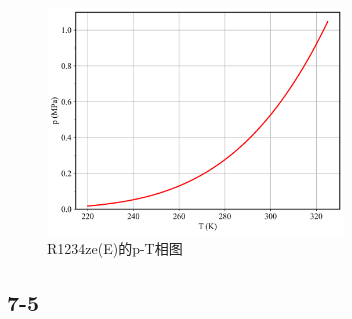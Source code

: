 \documentclass[12pt,a4paper]{article}
\begin{document}
\begin{figure}[H]
    \centering
    \includegraphics[width=0.7\textwidth]{../chp7/figs/R1234ze(E)_pT.png}
    \caption{R1234ze(E)的p-T相图}
\end{figure}



\subsection*{7-5}
\end{document}
